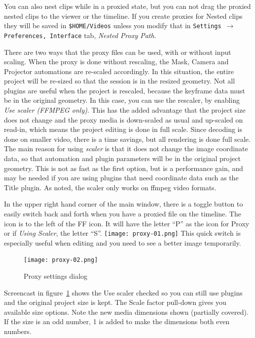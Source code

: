 You can also nest clips while in a proxied state, but you can not drag the proxied nested clips
to the viewer or the timeline.
If you create proxies for Nested clips they will be saved in \texttt{\$HOME/Videos} unless you modify that in
\texttt{Settings $\rightarrow$ Preferences, Interface} tab, \textit{Nested Proxy Path}. 

There are two ways that the proxy files can be used, with or without input scaling. When the proxy is done without rescaling, the Mask, Camera and Projector automations are re-scaled accordingly. In this situation, the entire project will be re-sized so that the session is in the resized geometry.  Not all plugins are useful when the project is rescaled, because the keyframe data must be in the original geometry.  In this case, you can use the rescaler, by enabling \textit{Use scaler (FFMPEG only)}. This has the added advantage that the project size does not change and the proxy media is down-scaled as usual and up-scaled on read-in, which means the project editing is done in full scale.   Since decoding is done on smaller video, there is a time savings, but all rendering is done full scale.  The main reason for using \textit{scaler} is that it does not change the image coordinate data, so that automation and plugin parameters will be in the original project geometry.   This is not as fast as the first option, but is a performance gain, and may be needed if you are using plugins that need coordinate data such as the Title plugin.  As noted, the scaler only works on ffmpeg video formats.

In the upper right hand corner of the main window, there is a toggle button to easily switch back and forth when you have a proxied file on the timeline.  The icon is to the left of the FF icon.  It will have the letter “P” as the icon for Proxy or if \textit{Using Scaler}, the letter “S”. \quad \texttt{[image: proxy-01.png]} \quad This quick switch is especially useful when editing and you need to see a better image temporarily.

\begin{figure}[htpb]
	\centering
	\texttt{[image: proxy-02.png]}
	\caption{Proxy settings dialog}
	\label{fig:proxy-02}
\end{figure}

Screencast in figure~\ref{fig:proxy-02} shows the Use scaler checked so you can still use plugins and the original project size is kept.  The Scale factor pull-down gives you available size options.  Note the new media dimensions shown (partially covered).  If the size is an odd number, 1 is added to make the dimensions both even numbers.

